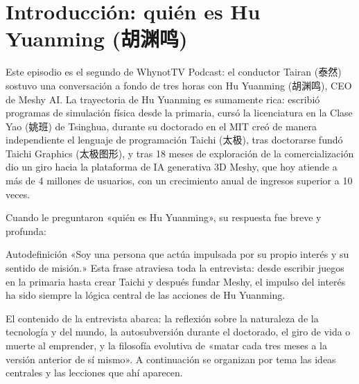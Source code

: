 \section{Introducción: quién es Hu Yuanming (胡渊鸣)}

Este episodio es el segundo de WhynotTV Podcast: el conductor Tairan (泰然) sostuvo una conversación a fondo de tres horas con Hu Yuanming (胡渊鸣), CEO de Meshy AI. La trayectoria de Hu Yuanming es sumamente rica: escribió programas de simulación física desde la primaria, cursó la licenciatura en la Clase Yao (姚班) de Tsinghua, durante su doctorado en el MIT creó de manera independiente el lenguaje de programación Taichi (太极), tras doctorarse fundó Taichi Graphics (太极图形), y tras 18 meses de exploración de la comercialización dio un giro hacia la plataforma de IA generativa 3D Meshy, que hoy atiende a más de 4 millones de usuarios, con un crecimiento anual de ingresos superior a 10 veces.

Cuando le preguntaron «quién es Hu Yuanming», su respuesta fue breve y profunda:

\begin{importantbox}{Autodefinición}
«Soy una persona que actúa impulsada por su propio interés y su sentido de misión.» Esta frase atraviesa toda la entrevista: desde escribir juegos en la primaria hasta crear Taichi y después fundar Meshy, el impulso del interés ha sido siempre la lógica central de las acciones de Hu Yuanming.
\end{importantbox}

El contenido de la entrevista abarca: la reflexión sobre la naturaleza de la tecnología y del mundo, la autosubversión durante el doctorado, el giro de vida o muerte al emprender, y la filosofía evolutiva de «matar cada tres meses a la versión anterior de sí mismo». A continuación se organizan por tema las ideas centrales y las lecciones que ahí aparecen.

